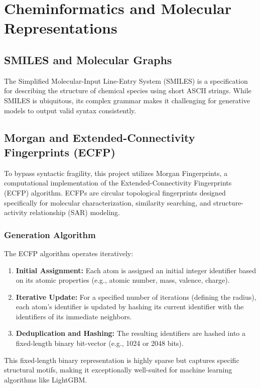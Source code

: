 \section{Cheminformatics and Molecular Representations}

\subsection{SMILES and Molecular Graphs}
The Simplified Molecular-Input Line-Entry System (SMILES) is a specification for describing the structure of chemical species using short ASCII strings. While SMILES is ubiquitous, its complex grammar makes it challenging for generative models to output valid syntax consistently. 

\subsection{Morgan and Extended-Connectivity Fingerprints (ECFP)}
To bypass syntactic fragility, this project utilizes Morgan Fingerprints, a computational implementation of the Extended-Connectivity Fingerprints (ECFP) algorithm. ECFPs are circular topological fingerprints designed specifically for molecular characterization, similarity searching, and structure-activity relationship (SAR) modeling.

\subsubsection{Generation Algorithm}
The ECFP algorithm operates iteratively:
\begin{enumerate}
    \item \textbf{Initial Assignment:} Each atom is assigned an initial integer identifier based on its atomic properties (e.g., atomic number, mass, valence, charge).
    \item \textbf{Iterative Update:} For a specified number of iterations (defining the radius), each atom's identifier is updated by hashing its current identifier with the identifiers of its immediate neighbors.
    \item \textbf{Deduplication and Hashing:} The resulting identifiers are hashed into a fixed-length binary bit-vector (e.g., 1024 or 2048 bits).
\end{enumerate}
This fixed-length binary representation is highly sparse but captures specific structural motifs, making it exceptionally well-suited for machine learning algorithms like LightGBM.

